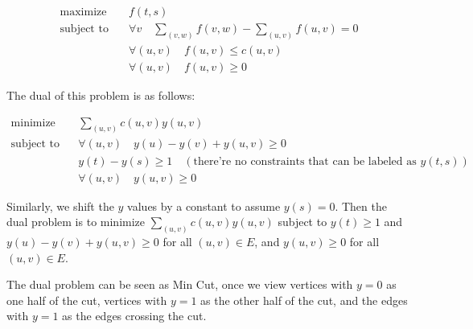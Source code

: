\begin{align*}
	\text{maximize} \quad   & f(t,s)                                                     \\
	\text{subject to} \quad & \forall v\quad \sum_{(v,w)}f(v,w) - \sum_{(u,v)}f(u,v) = 0 \\
	                        & \forall (u,v)\quad f(u,v) \leq c(u,v)                      \\
	                        & \forall (u,v)\quad f(u,v) \geq 0
\end{align*}

The dual of this problem is as follows:

\begin{align*}
	\text{minimize} \quad   & \sum_{(u,v)} c(u,v) y(u,v)                                                               \\
	\text{subject to} \quad & \forall (u,v) \quad y(u) - y(v) + y(u,v) \geq 0                                          \\
	                        & y(t) - y(s) \geq 1 \quad (\text{there're no constraints that can be labeled as } y(t,s)) \\
	                        & \forall (u,v) \quad y(u,v) \geq 0
\end{align*}

Similarly, we shift the $y$ values by a constant to assume $y(s) = 0$. Then the dual problem is to minimize $\sum_{(u,v)} c(u,v) y(u,v)$ subject to $y(t) \geq 1$ and $y(u) - y(v) + y(u,v) \geq 0$ for all $(u,v)\in E$, and $y(u,v) \geq 0$ for all $(u,v)\in E$.

The dual problem can be seen as Min Cut, once we view vertices with $y = 0$ as one half of the cut, vertices with $y = 1$ as the other half of the cut, and the edges with $y = 1$ as the edges crossing the cut.











